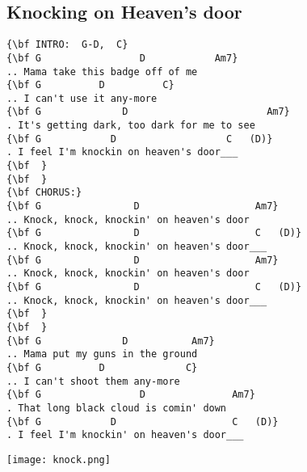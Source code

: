 \documentclass[a4paper]{article}
\begin{document}
\subsection{Knocking on Heaven's door} %
\label{sub:Knocking on Heaven's door}
\begin{Verbatim}[commandchars=\\\{\}]
{\bf INTRO:  G-D,  C}
{\bf G                 D            Am7}
.. Mama take this badge off of me
{\bf G          D          C}
.. I can't use it any-more
{\bf G              D                        Am7}
. It's getting dark, too dark for me to see
{\bf G            D                   C   (D)}
. I feel I'm knockin on heaven's door___
{\bf  }
{\bf  }
{\bf CHORUS:}
{\bf G                D                    Am7}
.. Knock, knock, knockin' on heaven's door
{\bf G                D                    C   (D)}
.. Knock, knock, knockin' on heaven's door___
{\bf G                D                    Am7}
.. Knock, knock, knockin' on heaven's door
{\bf G                D                    C   (D)}
.. Knock, knock, knockin' on heaven's door___
{\bf  }
{\bf  }
{\bf G              D           Am7}
.. Mama put my guns in the ground
{\bf G          D              C}
.. I can't shoot them any-more
{\bf G                 D               Am7}
. That long black cloud is comin' down
{\bf G            D                    C   (D)}
. I feel I'm knockin' on heaven's door___
\end{Verbatim}
\newpage
\centerline{\texttt{[image: knock.png]}}
\newpage
\end{document}

